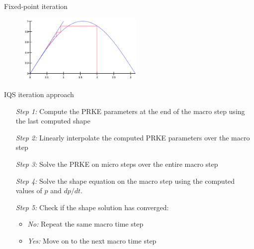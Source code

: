 \documentclass[8pt,xcolor=dvipnames]{beamer}
\begin{document}
\begin{frame}{Fixed-point iteration}

\begin{figure}
\includegraphics[height=1.3in]{figures/fixed_point.png}
\end{figure}
\begin{block}{IQS iteration approach}
\setlength{\leftmargini}{10mm}
\begin{itemize}
\item[\textit{Step 1:}] Compute the PRKE parameters at the end of the macro step using the last computed shape
\item[\textit{Step 2:}] Linearly interpolate the computed PRKE parameters over the macro step
\item[\textit{Step 3:}] Solve the PRKE on micro steps over the entire macro step
\item[\textit{Step 4:}] Solve the shape equation on the macro step using the computed values of $p$ and $dp/dt$.
\item[\textit{Step 5:}] Check if the shape solution has converged:
	\begin{itemize}
	\item \textit{No:} Repeat the same macro time step
	\item \textit{Yes:} Move on to the next macro time step
	\end{itemize}
\end{itemize}
\end{block}

\end{frame}
\end{document}
